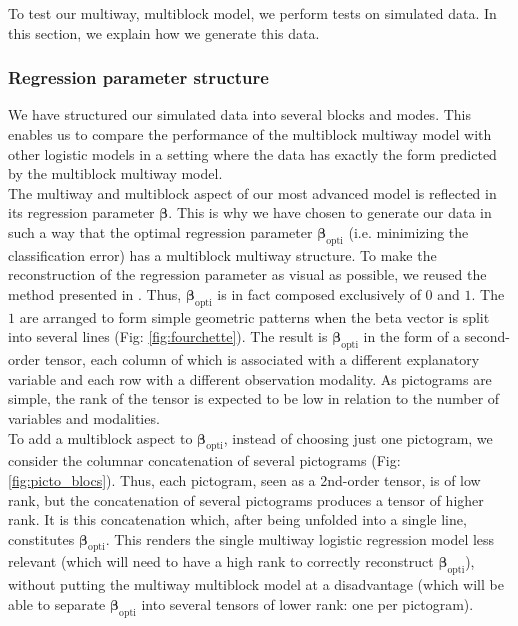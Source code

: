 \documentclass[preprint,12pt]{elsarticle}
\begin{document}
\noindent To test our multiway, multiblock model, we perform tests on simulated data. In this section, we explain how we generate this data.
\subsubsection{Regression parameter structure}

\noindent We have structured our simulated data into several blocks and modes. This enables us to compare the performance of the multiblock multiway model with other logistic models in a setting where the data has exactly the form predicted by the multiblock multiway model.\\
\indent The multiway and multiblock aspect of our most advanced model is reflected in its regression parameter $\bm{\beta}$. This is why we have chosen to generate our data in such a way that the optimal regression parameter $\bm{\beta}_{\text{opti}}$ (i.e. minimizing the classification error) has a multiblock multiway structure. To make the reconstruction of the regression parameter as visual as possible, we reused the method presented in \cite{picto}. Thus, $\bm{\beta}_{\text{opti}}$ is in fact composed exclusively of $0$ and $1$. The $1$ are arranged to form simple geometric patterns when the beta vector is split into several lines (Fig: \ref{fig:fourchette}). The result is $\bm{\beta}_{\text{opti}}$ in the form of a second-order tensor, each column of which is associated with a different explanatory variable and each row with a different observation modality. As pictograms are simple, the rank of the tensor is expected to be low in relation to the number of variables and modalities.\\
\indent To add a multiblock aspect to $\bm{\beta}_{\text{opti}}$, instead of choosing just one pictogram, we consider the columnar concatenation of several pictograms (Fig: \ref{fig:picto_blocs}). Thus, each pictogram, seen as a 2nd-order tensor, is of low rank, but the concatenation of several pictograms produces a tensor of higher rank. It is this concatenation which, after being unfolded into a single line, constitutes $\bm{\beta}_{\text{opti}}$. This renders the single multiway logistic regression model less relevant (which will need to have a high rank to correctly reconstruct $\bm{\beta}_{\text{opti}}$), without putting the multiway multiblock model at a disadvantage (which will be able to separate $\bm{\beta}_{\text{opti}}$ into several tensors of lower rank: one per pictogram).
\end{document}

